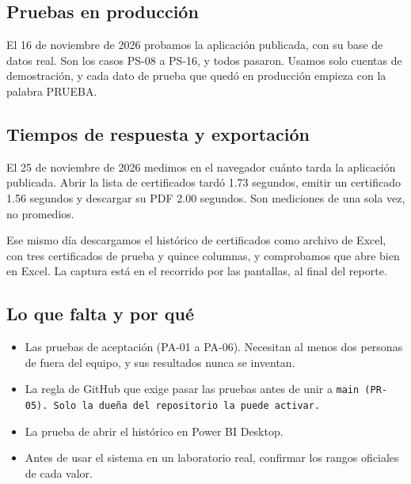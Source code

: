 \subsection{Pruebas en producción}\label{sec:vivo}

El 16 de noviembre de 2026 probamos la aplicación publicada, con su base de datos real. Son los casos PS-08 a PS-16, y todos pasaron. Usamos solo cuentas de demostración, y cada dato de prueba que quedó en producción empieza con la palabra PRUEBA.

\subsection{Tiempos de respuesta y exportación}\label{sec:mediciones}

El 25 de noviembre de 2026 medimos en el navegador cuánto tarda la aplicación publicada. Abrir la lista de certificados tardó 1.73 segundos, emitir un certificado 1.56 segundos y descargar su PDF 2.00 segundos. Son mediciones de una sola vez, no promedios.

Ese mismo día descargamos el histórico de certificados como archivo de Excel, con tres certificados de prueba y quince columnas, y comprobamos que abre bien en Excel. La captura está en el recorrido por las pantallas, al final del reporte.

\subsection{Lo que falta y por qué}\label{sec:falta}

\begin{itemize}
  \item Las pruebas de aceptación (PA-01 a PA-06). Necesitan al menos dos personas de fuera del equipo, y sus resultados nunca se inventan.
  \item La regla de GitHub que exige pasar las pruebas antes de unir a \tt{main} (PR-05). Solo la dueña del repositorio la puede activar.
  \item La prueba de abrir el histórico en Power BI Desktop.
  \item Antes de usar el sistema en un laboratorio real, confirmar los rangos oficiales de cada valor.
\end{itemize}
